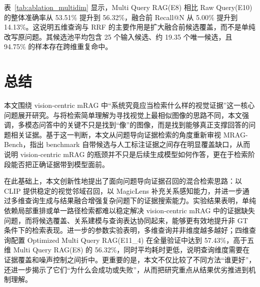 \begin{table}[!htbp]
\centering
\fontsize{7.8pt}{8.6pt}\selectfont
\setlength{\tabcolsep}{4pt}
\renewcommand{\arraystretch}{0.86}
\caption{单维查询与多维查询比较结果。}
\label{tab:ablation_multidim}
\end{table}

表~\ref{tab:ablation_multidim} 显示，Multi Query RAG(E8) 相比 Raw Query(E10) 的整体准确率从 53.51\% 提升到 56.32\%，融合前 Recall@N 从 5.00\% 提升到 14.13\%。这说明五维查询与 RRF 的主要作用是扩大融合前候选覆盖，而不是单纯改写原问题。其候选池平均包含 25 个输入候选、约 19.35 个唯一候选，且 94.75\% 的样本存在跨维重复命中。

\chapter{总结}

本文围绕 vision-centric mRAG 中“系统究竟应当检索什么样的视觉证据”这一核心问题展开研究。与将检索简单理解为寻找视觉上最相似图像的思路不同，本文强调，多模态问答中的关键不只是找到“像”的图像，而是找到能够真正支撑回答的问题相关证据。基于这一判断，本文从问题导向证据检索的角度重新审视 MRAG-Bench，指出 benchmark 自带候选与人工标注证据之间存在明显覆盖缺口，从而说明 vision-centric mRAG 的瓶颈并不只是后续生成模型如何作答，更在于检索阶段能否把正确证据带到模型面前。

在此基础上，本文创新性地提出了面向问题导向证据召回的混合检索思路：以 CLIP 提供稳定的视觉邻域召回，以 MagicLens 补充关系感知能力，并进一步通过多维查询生成与结果融合增强复杂问题下的证据搜索能力。实验结果表明，单纯依赖局部重排或单一路径检索都难以稳定解决 vision-centric mRAG 中的证据缺失问题，而将候选覆盖、关系建模与查询表达协同起来，能够更有效地提升非 GT 条件下的检索表现。进一步的参数实验表明，多维查询并非维度越多越好；四维查询配置 Optimized Multi Query RAG(E11\_4) 在全量验证中达到 57.43\%，高于五维 Multi Query RAG(E8) 的 56.32\%，同时平均耗时更低，说明查询维度需要在证据覆盖和噪声控制之间折中。更重要的是，本文不仅比较了不同方法“谁更好”，还进一步揭示了它们“为什么会成功或失败”，从而把研究重点从结果优劣推进到机制理解。

